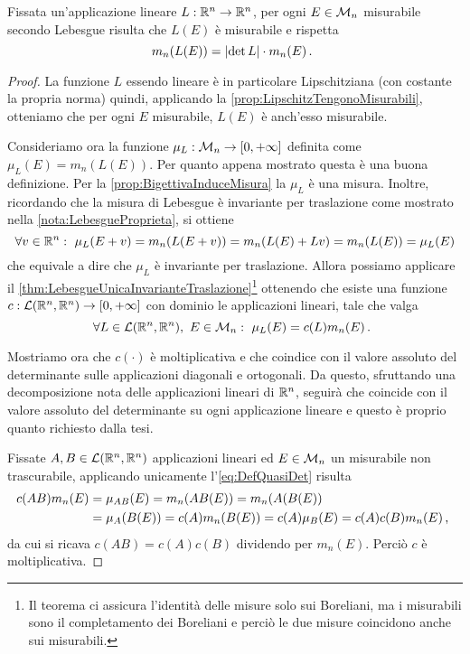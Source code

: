 \begin{proposition}\label{prop:MisuraImmagineLineare}
	Fissata un'applicazione lineare $L:\mathbb R^n\to\mathbb R^n$, per ogni $E\in\mathcal M_n$ misurabile secondo Lebesgue risulta che $L(E)$ è misurabile e rispetta
	\begin{equation}
		m_n(L(E))=\lvert \det L\rvert\cdot m_n(E)\, \text{. }
	\end{equation}
\end{proposition}
\begin{proof}
	La funzione $L$ essendo lineare è in particolare Lipschitziana (con costante la propria norma) quindi, applicando la \cref{prop:LipschitzTengonoMisurabili}, otteniamo che per ogni $E$ misurabile, $L(E)$ è anch'esso misurabile.
	
	Consideriamo ora la funzione $\mu_L:\mathcal M_n\to[0,+\infty]$ definita come $\mu_L(E)=m_n(L(E))$. Per quanto appena mostrato questa è una buona definizione.
	Per la \cref{prop:BigettivaInduceMisura} la $\mu_L$ è una misura.
	Inoltre, ricordando che la misura di Lebesgue è invariante per traslazione come mostrato nella \cref{nota:LebesgueProprieta}, si ottiene
	\begin{equation*}
		\forall v\in\R^n:\ \mu_L(E+v)=m_n(L(E+v))=m_n(L(E)+Lv)=m_n(L(E))=\mu_L(E)
	\end{equation*}
	che equivale a dire che $\mu_L$ è invariante per traslazione.
	\newcommand{\linR}{\ensuremath{\mathcal L(\R^n,\R^n)}}
	Allora possiamo applicare il \cref{thm:LebesgueUnicaInvarianteTraslazione}\footnote{Il teorema ci assicura l'identità delle misure solo sui Boreliani, ma i misurabili sono il completamento dei Boreliani e perciò le due misure coincidono anche sui misurabili.} ottenendo che esiste una funzione $c:\linR\to\Rpiu$ con dominio le applicazioni lineari, tale che valga
	\begin{equation}\label{eq:DefQuasiDet}
		\forall L\in \linR,\ E\in\M_n:\ \mu_L(E)=c(L)m_n(E)\punto
	\end{equation}
	
	Mostriamo ora che $c(\cdot)$ è moltiplicativa e che coindice con il valore assoluto del determinante sulle applicazioni diagonali e ortogonali. Da questo, sfruttando una decomposizione nota delle applicazioni lineari di $\mathbb R^n$, seguirà che coincide con il valore assoluto del determinante su ogni applicazione lineare e questo è proprio quanto richiesto dalla tesi. 
	
	Fissate $A,B\in \linR$ applicazioni lineari ed $E\in\mathcal M_n$ un misurabile non trascurabile, applicando unicamente l'\cref{eq:DefQuasiDet} risulta
	\begin{align*}
		c(AB)m_n(E)&=\mu_{AB}(E)=m_n(AB(E))=m_n(A(B(E))\\
		&=\mu_A(B(E))=c(A)m_n(B(E))=c(A)\mu_B(E)=c(A)c(B)m_n(E)\, \text{, }
	\end{align*}
	da cui si ricava $c(AB)=c(A)c(B)$ dividendo per $m_n(E)$. Perciò $c$ è moltiplicativa.
	

\end{proof}

